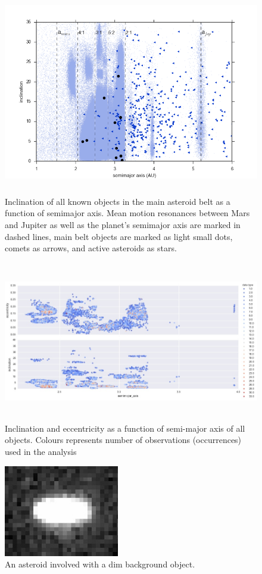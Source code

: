 \documentclass[iop,apj]{emulateapj}
\begin{document}




\begin{figure}[!htb]
    \centering
    \includegraphics[height=9cm]{graphs/aa_comets_mba_all.png}
    \caption{Inclination of all known objects in the main asteroid belt as a function of semimajor axis.  Mean motion resonances between Mars and Jupiter as well as the planet's semimajor axis are marked in dashed lines, main belt objects are marked as light small dots, comets as arrows, and active asteroids as stars. \cite{mpc}}\label{fig:1}
\end{figure}

\begin{figure}[!htb]
    \centering
    \includegraphics[height=7cm]{graphs/a_e_i_occur.png}
    \caption{Inclination and eccentricity as a function of semi-major axis of all objects. Colours represents number of observations (occurrences) used in the analysis}\label{fig:2}
\end{figure}

\begin{figure}[!htb]
    \centering
    \includegraphics[height=4cm]{images/background_gal.jpeg}
    \caption{An asteroid involved with a dim background object. }\label{fig:3}
\end{figure}
\end{document}
